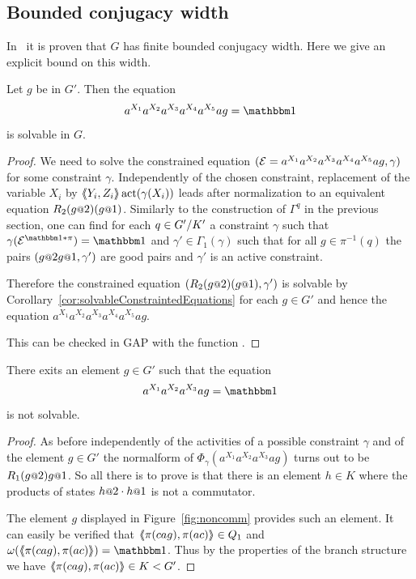 \documentclass[a4paper,11pt]{amsart}
\begin{document}
\subsection{Bounded conjugacy width}
In~\cite{Fink:Conjugacy_growth} it is proven that $G$ has finite bounded conjugacy width. Here we give an explicit bound 
on this width.
\begin{pro}\label{pro:productOf6Conjugates}
 Let $g$ be in $G'$. Then the equation 
 \begin{align*}
  a^{X_1}a^{X_2}a^{X_3}a^{X_4}a^{X_5}ag=\id
 \end{align*}
is solvable in $G$. 
\end{pro}
\begin{proof}
We need to solve the constrained equation $(\mathcal{E}=a^{X_1}a^{X_2}a^{X_3}a^{X_4}a^{X_5}ag,\gamma)$ for
some constraint $\gamma$. Independently of the chosen constraint, replacement of
the variable $X_i$ by $\langle\negthickspace\langle Y_i,Z_i\rangle\negthickspace\rangle\operatorname{act}(\gamma(X_i))$ leads after normalization to an equivalent equation 
$R_2(g\at{2})(g\at{1})$. Similarly to the construction of $\Gamma^q$ in the previous section, one can find for each $q\in{G'/K'}$ a constraint $\gamma$ such that
$\gamma(\eq{E}^{\id*\pi})=\id$ and $\gamma'\in\Gamma_1(\gamma)$ such that for all 
$g\in\pi^{-1}(q)$ the pairs $(g\at{2}g\at{1},\gamma')$ are good pairs and $\gamma'$ is 
an active constraint.

Therefore the constrained equation $(R_2(g\at{2})(g\at{1}),\gamma')$ is solvable
by Corollary~\ref{cor:solvableConstraintedEquations}
for each $g\in G'$ and hence the equation $a^{X_1}a^{X_2}a^{X_3}a^{X_4}a^{X_5}ag$.

This can be checked in GAP with the function .
\end{proof}	
\begin{lem}
 There exits an element $g\in G'$ such that the equation 
 \begin{align*}
  a^{X_1}a^{X_2}a^{X_3}ag=\id
 \end{align*}
 is not solvable.
\end{lem}
\begin{proof}
As before independently of the activities of a possible constraint $\gamma$ and of the element $g\in G'$
the normalform of $\Phi_\gamma(a^{X_1}a^{X_2}a^{X_3}ag)$ turns out to
be $R_1(g\at{2}) g\at{1}$. So all there is to prove is that there is an element $h\in K$
where the products of states $h\at{2}\cdot h\at{1}$ is not a commutator.

The element $g$ displayed in Figure~\ref{fig:noncomm} provides such an element. It can easily be verified 
that $\langle\negthickspace\langle\pi(cag),\pi(ac)\rangle\negthickspace\rangle\in Q_1$ and $\omega(\pair{\pi(cag),\pi(ac)})=\id$. Thus by
the properties of the branch structure we have $\langle\negthickspace\langle\pi(cag),\pi(ac)\rangle\negthickspace\rangle\in K<G'$. 
\end{proof}
\end{document}
